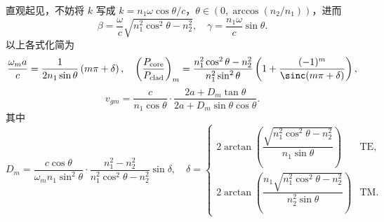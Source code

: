 直观起见，不妨将 \(k\) 写成 \(k = n_1 \omega \cos\theta / c\)，\(\theta \in \left( 0, \arccos(n_2/n_1) \right)\)，进而
\begin{equation*}
	\beta = \frac{\omega}{c} \sqrt{n_1^2 \cos^2\theta - n_2^2},\quad\gamma = \frac{n_1 \omega}{c} \sin\theta.
\end{equation*}
以上各式化简为
\begin{equation*}
	\dfrac{\omega_m a}{c} = \dfrac{1}{2 n_1 \sin\theta} \left( m\pi + \delta \right), \quad \left( \dfrac{P_{\text{core}}}{P_{\text{clad}}} \right)_m = \dfrac{n_1^2 \cos^2\theta - n_2^2}{n_1^2 \sin^2\theta} \left( 1 + \dfrac{(-1)^m}{\sinc(m\pi + \delta)} \right),
\end{equation*}
\begin{equation*}
	v_{gm} = \dfrac{c}{n_1 \cos\theta} \cdot \dfrac{2a + D_m \tan\theta}{2a + D_m \sin\theta \cos\theta}.
\end{equation*}
其中
\begin{equation*}
	D_m = \dfrac{c \cos\theta}{\omega_m n_1 \sin^2\theta} \cdot \dfrac{n_1^2 - n_2^2}{n_1^2 \cos^2\theta - n_2^2} \sin\delta, \quad \delta =
	\begin{cases}
		2 \arctan\left( \dfrac{\sqrt{n_1^2 \cos^2\theta - n_2^2}}{n_1 \sin\theta} \right)       & \text{TE}, \\
		2 \arctan\left( \dfrac{n_1 \sqrt{n_1^2 \cos^2\theta - n_2^2}}{n_2^2 \sin\theta} \right) & \text{TM}.
	\end{cases}
\end{equation*}

